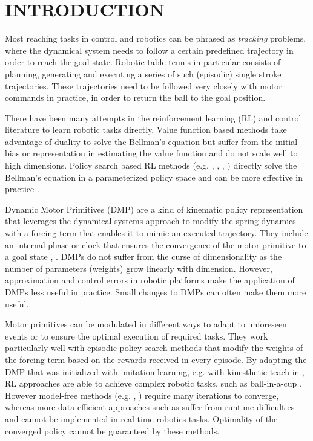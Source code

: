 \section{INTRODUCTION}\label{introduction}


Most reaching tasks in control and robotics can be phrased as \emph{tracking} problems, where the dynamical system needs to follow a certain predefined trajectory in order to reach the goal state. Robotic table tennis in particular \cite{Muelling13} consists of planning, generating and executing a series of such (episodic) single stroke trajectories. These trajectories need to be followed very closely with motor commands in practice, in order to return the ball to the goal position. 

There have been many attempts in the reinforcement learning (RL) \cite{Sutton98} and control literature to learn robotic tasks directly. Value function based methods take advantage of duality to solve the Bellman's equation but suffer from the initial bias or representation in estimating the value function and do not scale well to high dimensions. Policy search based RL methods (e.g. \cite{Kober08}, \cite{Peter10}, \cite{Theodorou10}, \cite{Deisenroth11}) directly solve the Bellman's equation in a parameterized policy space and can be more effective in practice \cite{Kober13}. 

Dynamic Motor Primitives (DMP) are a kind of kinematic policy representation that leverages the dynamical systems approach to modify the spring dynamics with a forcing term that enables it to mimic an executed trajectory. They include an internal phase or clock that ensures the convergence of the motor primitive to a goal state \cite{Ijspeert13}, \cite{Schaal07}. DMPs do not suffer from the curse of dimensionality as the number of parameters (weights) grow linearly with dimension. However, approximation and control errors in robotic platforms make the application of DMPs less useful in practice. Small changes to DMPs can often make them more useful.

Motor primitives can be modulated in different ways to adapt to unforeseen events or to ensure the optimal execution of required tasks. They work particularly well with episodic policy search methods that modify the weights of the forcing term based on the rewards received in every episode. By adapting the DMP that was initialized with imitation learning, e.g. with kinesthetic teach-in \cite{Muelling13}, RL approaches are able to achieve complex robotic tasks, such as ball-in-a-cup \cite{Kober09}. However model-free methods (e.g. \cite{Kober08}, \cite{Peter10}) require many iterations to converge, whereas more data-efficient approaches such as \cite{Deisenroth11} suffer from runtime difficulties and cannot be implemented in real-time robotics tasks. Optimality of the converged policy cannot be guaranteed by these methods.

